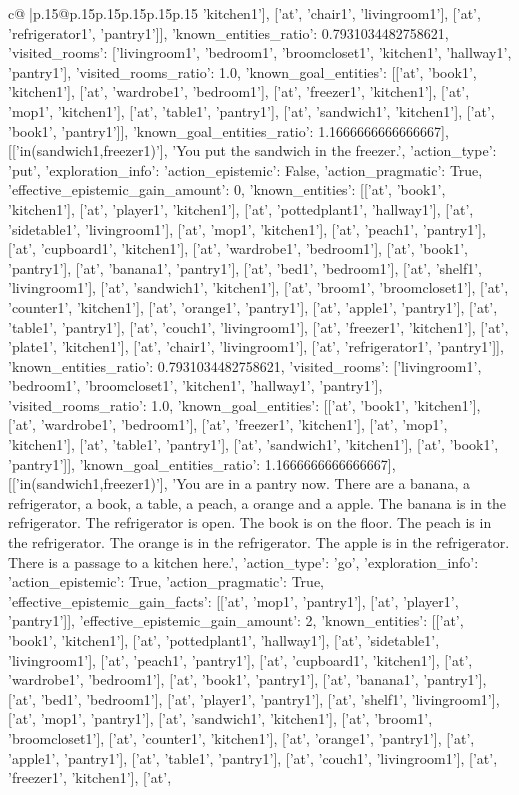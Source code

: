 \documentclass{article}
\begin{document}
{\begin{supertabular}{c@{$\;$}|p{.15\linewidth}@{}p{.15\linewidth}p{.15\linewidth}p{.15\linewidth}p{.15\linewidth}p{.15\linewidth}}
{{{'kitchen1'], ['at', 'chair1', 'livingroom1'], ['at', 'refrigerator1', 'pantry1']], 'known_entities_ratio': 0.7931034482758621, 'visited_rooms': ['livingroom1', 'bedroom1', 'broomcloset1', 'kitchen1', 'hallway1', 'pantry1'], 'visited_rooms_ratio': 1.0, 'known_goal_entities': [['at', 'book1', 'kitchen1'], ['at', 'wardrobe1', 'bedroom1'], ['at', 'freezer1', 'kitchen1'], ['at', 'mop1', 'kitchen1'], ['at', 'table1', 'pantry1'], ['at', 'sandwich1', 'kitchen1'], ['at', 'book1', 'pantry1']], 'known_goal_entities_ratio': 1.1666666666666667}}], [['in(sandwich1,freezer1)'], 'You put the sandwich in the freezer.', {'action_type': 'put', 'exploration_info': {'action_epistemic': False, 'action_pragmatic': True, 'effective_epistemic_gain_amount': 0, 'known_entities': [['at', 'book1', 'kitchen1'], ['at', 'player1', 'kitchen1'], ['at', 'pottedplant1', 'hallway1'], ['at', 'sidetable1', 'livingroom1'], ['at', 'mop1', 'kitchen1'], ['at', 'peach1', 'pantry1'], ['at', 'cupboard1', 'kitchen1'], ['at', 'wardrobe1', 'bedroom1'], ['at', 'book1', 'pantry1'], ['at', 'banana1', 'pantry1'], ['at', 'bed1', 'bedroom1'], ['at', 'shelf1', 'livingroom1'], ['at', 'sandwich1', 'kitchen1'], ['at', 'broom1', 'broomcloset1'], ['at', 'counter1', 'kitchen1'], ['at', 'orange1', 'pantry1'], ['at', 'apple1', 'pantry1'], ['at', 'table1', 'pantry1'], ['at', 'couch1', 'livingroom1'], ['at', 'freezer1', 'kitchen1'], ['at', 'plate1', 'kitchen1'], ['at', 'chair1', 'livingroom1'], ['at', 'refrigerator1', 'pantry1']], 'known_entities_ratio': 0.7931034482758621, 'visited_rooms': ['livingroom1', 'bedroom1', 'broomcloset1', 'kitchen1', 'hallway1', 'pantry1'], 'visited_rooms_ratio': 1.0, 'known_goal_entities': [['at', 'book1', 'kitchen1'], ['at', 'wardrobe1', 'bedroom1'], ['at', 'freezer1', 'kitchen1'], ['at', 'mop1', 'kitchen1'], ['at', 'table1', 'pantry1'], ['at', 'sandwich1', 'kitchen1'], ['at', 'book1', 'pantry1']], 'known_goal_entities_ratio': 1.1666666666666667}}], [['in(sandwich1,freezer1)'], 'You are in a pantry now. There are a banana, a refrigerator, a book, a table, a peach, a orange and a apple. The banana is in the refrigerator. The refrigerator is open. The book is on the floor. The peach is in the refrigerator. The orange is in the refrigerator. The apple is in the refrigerator. There is a passage to a kitchen here.', {'action_type': 'go', 'exploration_info': {'action_epistemic': True, 'action_pragmatic': True, 'effective_epistemic_gain_facts': [['at', 'mop1', 'pantry1'], ['at', 'player1', 'pantry1']], 'effective_epistemic_gain_amount': 2, 'known_entities': [['at', 'book1', 'kitchen1'], ['at', 'pottedplant1', 'hallway1'], ['at', 'sidetable1', 'livingroom1'], ['at', 'peach1', 'pantry1'], ['at', 'cupboard1', 'kitchen1'], ['at', 'wardrobe1', 'bedroom1'], ['at', 'book1', 'pantry1'], ['at', 'banana1', 'pantry1'], ['at', 'bed1', 'bedroom1'], ['at', 'player1', 'pantry1'], ['at', 'shelf1', 'livingroom1'], ['at', 'mop1', 'pantry1'], ['at', 'sandwich1', 'kitchen1'], ['at', 'broom1', 'broomcloset1'], ['at', 'counter1', 'kitchen1'], ['at', 'orange1', 'pantry1'], ['at', 'apple1', 'pantry1'], ['at', 'table1', 'pantry1'], ['at', 'couch1', 'livingroom1'], ['at', 'freezer1', 'kitchen1'], ['at', }}}
\end{supertabular}}
\end{document}
